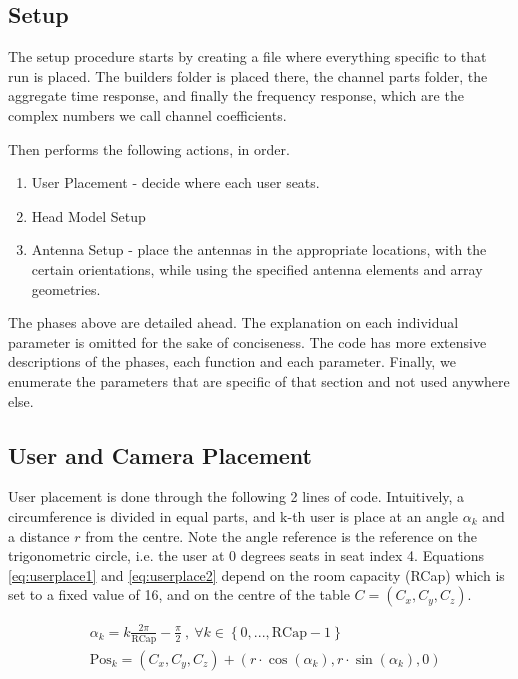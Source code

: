 \subsection{Setup}

The setup procedure starts by creating a file where everything specific to that run is placed. The builders folder is placed there, the channel parts folder, the aggregate time response, and finally the frequency response, which are the complex numbers we call channel coefficients.

Then performs the following actions, in order.
\begin{enumerate}
    \item User Placement - decide where each user seats. %
    \item Head Model Setup
    \item Antenna Setup - place the antennas in the appropriate locations, with the certain orientations, while using the specified antenna elements and array geometries. 
\end{enumerate}

The phases above are detailed ahead. The explanation on each individual parameter is omitted for the sake of conciseness. The code has more extensive descriptions of the phases, each function and each parameter. Finally, we enumerate the parameters that are specific of that section and not used anywhere else.


\subsection*{User and Camera Placement}
User placement is done through the following 2 lines of code. Intuitively, a circumference is divided in equal parts, and k-th user is place at an angle $\alpha_k$ and a distance $r$ from the centre. Note the angle reference is the reference on the trigonometric circle, i.e. the user at 0 degrees seats in seat index 4. Equations \ref{eq:userplace1} and \ref{eq:userplace2} depend on the room capacity (RCap) which is set to a fixed value of 16, and on the centre of the table $C = (C_x, C_y, C_z)$.

\begin{align}
    &\alpha_k = k  \frac{2 \pi}{\text{RCap}} - \frac{\pi}{2} \ , \ \forall k \in \left\{0, ..., \text{RCap} - 1\right\} \label{eq:userplace1}\\
    &\text{Pos}_k = (C_x, C_y, C_z) + (r \cdot \cos(\alpha_k), r \cdot \sin(\alpha_k), 0) \label{eq:userplace2}
\end{align}

